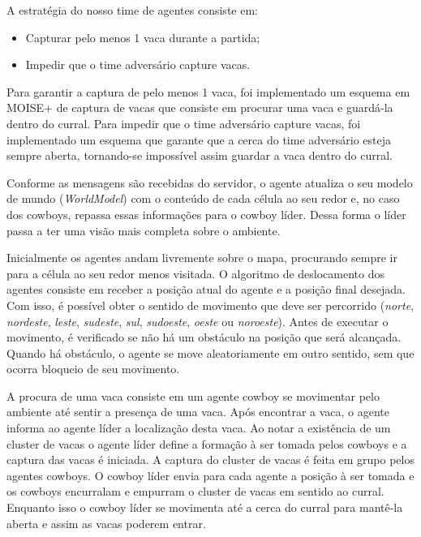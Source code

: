 \documentclass{llncs}
\begin{document}
A estratégia do nosso time de agentes consiste em:

\begin{itemize}
\item Capturar pelo menos 1 vaca durante a partida;
\item Impedir que o time adversário capture vacas.
\end{itemize}

Para garantir a captura de pelo menos 1 vaca, foi implementado um esquema em MOISE+ de captura de vacas que consiste em procurar uma vaca e guardá-la dentro do curral. Para impedir que o time adversário capture vacas, foi implementado um esquema que garante que a cerca do time adversário esteja sempre aberta, tornando-se impossível assim guardar a vaca dentro do curral.

Conforme as mensagens são recebidas do servidor, o agente atualiza o seu modelo de mundo (\textit{WorldModel}) com o conteúdo de cada célula ao seu redor e, no caso dos cowboys, repassa essas informações para o cowboy líder. Dessa forma o líder passa a ter uma visão mais completa sobre o ambiente.

Inicialmente os agentes andam livremente sobre o mapa, procurando sempre ir para a célula ao seu redor menos visitada. O algoritmo de deslocamento dos agentes consiste em receber a posição atual do agente e a posição final desejada. Com isso, é possível obter o sentido de movimento que deve ser percorrido (\textit{norte}, \textit{nordeste}, \textit{leste}, \textit{sudeste}, \textit{sul}, \textit{sudoeste}, \textit{oeste} ou \textit{noroeste}). Antes de executar o movimento, é verificado se não há um obstáculo na posição que será alcançada. Quando há obstáculo, o agente se move aleatoriamente em outro sentido, sem que ocorra bloqueio de seu movimento.

A procura de uma vaca consiste em um agente cowboy se movimentar pelo ambiente até sentir a presença de uma vaca. Após encontrar a vaca, o agente informa ao agente líder a localização desta vaca. Ao notar a existência de um cluster de vacas o agente líder define a formação à ser tomada pelos cowboys e a captura das vacas é iniciada. A captura do cluster de vacas é feita em grupo pelos agentes cowboys. O cowboy líder envia para cada agente a posição à ser tomada e os cowboys encurralam e empurram o cluster de vacas em sentido ao curral. Enquanto isso o cowboy líder se movimenta até a cerca do curral para mantê-la aberta e assim as vacas poderem entrar.
\end{document}
